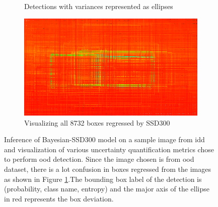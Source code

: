 \begin{figure}[H]
\begin{subfigure}[t]{0.495\textwidth}
    		\caption{Detections with variances represented as ellipses}
    	\end{subfigure}
    	\begin{subfigure}[t]{0.495\textwidth}
    		\centering
    		\includegraphics[width=\textwidth]{images/det_images/all_bnn_idd_0.png}
    		\caption{Visualizing all 8732 boxes regressed by SSD300}
    		\label{bnn_od_8732_boxes}
    	\end{subfigure}
    	
    	\caption[Bayesian SSD300 inference on image fro \acrshort{idd}]{Inference of Bayesian-SSD300 model on a sample image from \acrshort{idd} and visualization of various uncertainty quantification metrics chose to perform \acrshort{ood} detection. Since the image chosen is from \acrshort{ood} dataset, there is a lot confusion in boxes regressed from the images as shown in Figure \ref{bnn_od_8732_boxes}.The bounding box label of the detection is (probability, class name, entropy) and the major axis of the ellipse in red represents the box deviation.}
    	\label{bnn_inference_id_1}
    \end{figure}
    
